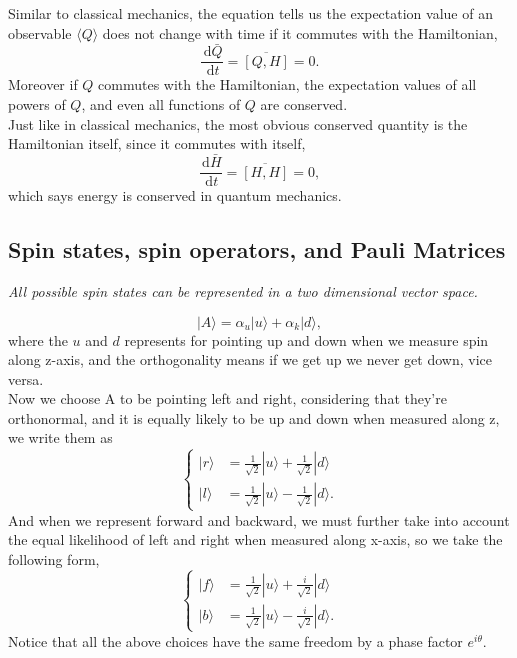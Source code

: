 \documentclass{article}
\newcommand{\be}{\begin{equation}}
\newcommand{\ee}{\end{equation}}
\newcommand{\dif}{\,\mathrm{d}}
\newcommand{\1}{\left}
\newcommand{\2}{\right}
\newcommand{\br}{\langle}
\newcommand{\ke}{\rangle}
\newcommand{\al}{\alpha}
\begin{document}
Similar to classical mechanics, the equation tells us the expectation value of an observable $\br Q\ke$  does not change with time if it commutes with the Hamiltonian,
\be
\frac{\dif\bar Q}{\dif t}=\overline{[Q,H]} =0.
\ee
Moreover if $Q$ commutes with the Hamiltonian, the expectation values of all powers of $Q$, and even all functions of $Q$ are conserved.\\
Just like in classical mechanics, the most obvious conserved quantity is the Hamiltonian itself, since it commutes with itself,
\be
\frac{\dif\bar H}{\dif t}=\overline{[H,H]}=0,
\ee
which says energy is conserved in quantum mechanics.

\subsection{Spin states, spin operators, and Pauli Matrices}
\textit{All possible spin states can be represented in a two dimensional vector space.}

\be
|A\ke=\al_u|u\ke+\al_k|d\ke,
\ee
where the $u$ and $d$ represents for pointing up and down when we measure spin along z-axis, and the orthogonality means if we get up we never get down, vice versa.\\
Now we choose A to be pointing left and right, considering that they're orthonormal, and it is equally likely to be up and down when measured along z, we write them as
\be\1\{\begin{split}
|r\ke&=\frac1 {\sqrt{2}}|u\ke+\frac1 {\sqrt{2}}|d\ke\\
|l\ke&=\frac1 {\sqrt{2}}|u\ke- \frac1 {\sqrt{2}}|d\ke.
\end{split}\2.\ee
And when we represent forward and backward, we must further take into account the equal likelihood of left and right when measured along x-axis, so we take the following form,
\be\1\{\begin{split}
|f\ke&=\frac1 {\sqrt{2}}|u\ke+\frac i {\sqrt{2}}|d\ke\\
|b\ke&=\frac1 {\sqrt{2}}|u\ke- \frac i {\sqrt{2}}|d\ke.
\end{split}\2.\ee
Notice that all the above choices have the same freedom by a phase factor $e^{i\theta}$.
\end{document}
